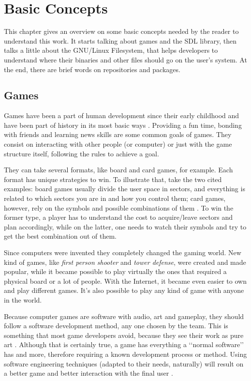 \chapter{Basic Concepts}
\label {sec:basic_concepts}

This chapter gives an overview on some basic concepts needed by the reader to understand this work. It starts talking about games and the SDL library, then talks a little about the GNU/Linux Filesystem, that helps developers to understand where their binaries and other files should go on the user's system. At the end, there are brief words on repositories and packages.

\section{Games}
\label {sec:games}

Games have been a part of human development since their early childhood and have been part of history in its most basic ways \cite{bethke2003game}. Providing a fun time, bonding with friends and learning news skills are some common goals of games. They consist on interacting with other people (or computer) or just with the game structure itself, following the rules to achieve a goal.

They can take several formats, like board and card games, for example. Each format has unique strategies to win. To illustrate that, take the two cited examples: board games usually divide the user space in sectors, and everything is related to which sectors you are in and how you control them; card games, however, rely on the symbols and possible combinations of them \cite{crawford1984art}. To win the former type, a player has to understand the cost to acquire/leave sectors and plan accordingly, while on the latter, one needs to watch their symbols and try to get the best combination out of them.

Since computers were invented they completely changed the gaming world. New kind of games, like \textit{first person shooter} and \textit{tower defense}, were created and made popular, while it became possible to play virtually the ones that required a physical board or a lot of people. With the Internet, it became even easier to own and play different games. It's also possible to play any kind of game with anyone in the world.

Because computer games are software with audio, art and gameplay, they should follow a software development method, any one chosen by the team. This is something that most game developers avoid, because they see their work as pure art \cite{bethke2003game}. Although that is certainly true, a game has everything a \lq\lq normal software\rq\rq{} has and more, therefore requiring a known development process or method. Using software engineering techniques (adapted to their needs, naturally) will result on a better game and better interaction with the final user \cite{pressman2009software}.


